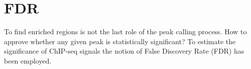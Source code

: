 \section{FDR}

To find enriched regions is not the last role of the peak calling process. How to approve whether any given peak is statistically significant? 
To estimate the significance of ChIP-seq signals the notion of False Discovery Rate (FDR) has been employed.










